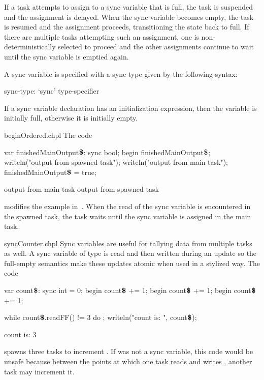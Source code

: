 If a task attempts to assign to a sync variable that is full, the task
is suspended and the assignment is delayed.  When the sync variable
becomes empty, the task is resumed and the assignment proceeds,
transitioning the state back to full.  If there are multiple tasks
attempting such an assignment, one is non-deterministically selected
to proceed and the other assignments continue to wait until the sync
variable is emptied again.

A sync variable is specified with a sync type given by the following
syntax:
\begin{syntax}
sync-type:
  `sync' type-specifier
\end{syntax}

If a sync variable declaration has an initialization expression, then
the variable is initially full, otherwise it is initially empty.

\begin{chapelexample}{beginOrdered.chpl}
The code
\begin{chapel}
var finishedMainOutput$\mbox{{\bf \$}}$: sync bool;
begin {
  finishedMainOutput$\mbox{{\bf \$}}$;
  writeln("output from spawned task");
}
writeln("output from main task");
finishedMainOutput$\mbox{{\bf \$}}$ = true;
\end{chapel}
\begin{chapeloutput}
output from main task
output from spawned task
\end{chapeloutput}
modifies the example in~.  When the read of the sync
variable is encountered in the spawned task, the task waits until the
sync variable is assigned in the main task.
\end{chapelexample}

\begin{chapelexample}{syncCounter.chpl}
Sync variables are useful for tallying data from multiple tasks as
well.  A sync variable of type  is read and then written
during an update so the full-empty semantics make these updates atomic
when used in a stylized way.  The code
\begin{chapel}
var count$\mbox{{\bf \$}}$: sync int = 0;
begin count$\mbox{{\bf \$}}$ += 1;
begin count$\mbox{{\bf \$}}$ += 1;
begin count$\mbox{{\bf \$}}$ += 1;
\end{chapel}
\begin{chapelpost}
while count$\mbox{{\bf \$}}$.readFF() != 3 do ;
writeln("count is: ", count$\mbox{{\bf \$}}$);
\end{chapelpost}
\begin{chapeloutput}
count is: 3
\end{chapeloutput}
spawns three tasks to increment .
If  was not a sync variable, this code
would be unsafe because between the points at which one task
reads  and
writes , another task may increment it.
\end{chapelexample}

